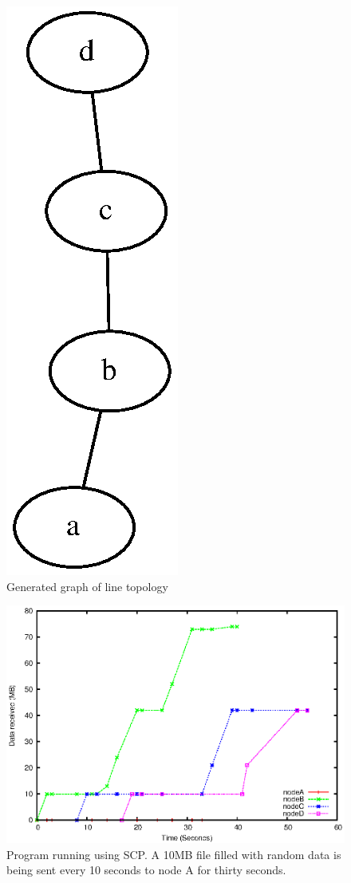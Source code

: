 \documentclass[12pt]{article}
\begin{document}
\pagebreak
\begin{figure}[ht!]
    \centering
    \includegraphics[height=0.4\textheight]{images/line-graph.eps}
    \caption{Generated graph of line topology}
    \label{fig:line_graph}
\end{figure}

\begin{figure}[hb!]
    \centering
    \includegraphics[height=0.4\textheight]{images/line-scp-10-fixes.eps}
    \caption{Program running using SCP. A 10MB file filled with random data
    is being sent every 10 seconds to node A for thirty seconds.}
    \label{fig:line_scp}
\end{figure}
\end{document}
